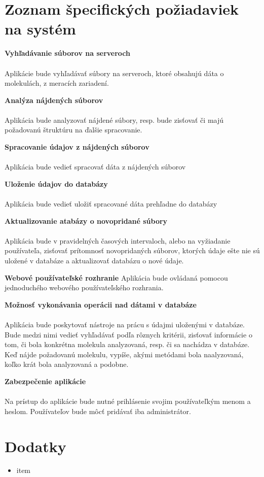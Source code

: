 \documentclass[12pt,a4paper]{article}
\begin{document}
\section{Zoznam špecifických požiadaviek na systém}
\begin{enumerate}[label={[\arabic*]}]
	\item { \bf Vyhľadávanie súborov na serveroch } \\ \\
	Aplikácie bude vyhľadávať súbory na serveroch, ktoré obsahujú dáta o molekulách, z meracích zariadení.
	\item { \bf Analýza nájdených súborov } \\ \\
	Aplikácia bude analyzovať nájdené súbory, resp. bude zisťovať či majú požadovanú štruktúru na ďalšie spracovanie.
	\item { \bf Spracovanie údajov z nájdených súborov } \\ \\
	Aplikácia bude vedieť spracovať dáta z nájdených súborov 
	\item { \bf Uloženie údajov do databázy }\\ \\
	Aplikácia bude vedieť uložiť spracované dáta prehľadne do databázy
	\item { \bf Aktualizovanie atabázy o novopridané súbory } \\ \\
	Aplikácia bude v pravidelných časových intervaloch, alebo na vyžiadanie používateľa,  zisťovať prítomnosť novopridaných súborov, ktorých údaje ešte nie sú uložené v databáze a aktualizovať databázu o nové údaje.
	\item { \bf  Webové používateľské rozhranie }
	Aplikácia bude ovládaná pomocou jednoduchého webového používateľského rozhrania.
	\item { \bf Možnosť vykonávania operácii nad dátami v databáze }\\ \\
	Aplikácia bude poskytovať nástroje na prácu s údajmi uloženými v databáze. Bude medzi nimi vedieť vyhľadávať podľa rôznych kritérii, zisťovať informácie o tom, či bola konkrétna molekula analyzovaná, resp. či sa nachádza v databáze. Keď nájde požadovanú molekulu, vypíše, akými metódami bola naalyzovaná, koľko krát bola analyzovaná a podobne.
	\item { \bf Zabezpečenie aplikácie } \\ \\
	Na prístup do aplikácie bude nutné prihlásenie svojim používateľkým menom a heslom. Používateľov bude môcť pridávať iba administrátor. 
	
\end{enumerate}

\section{Dodatky}
\begin{itemize}
	\item item
\end{itemize}
\end{document}
